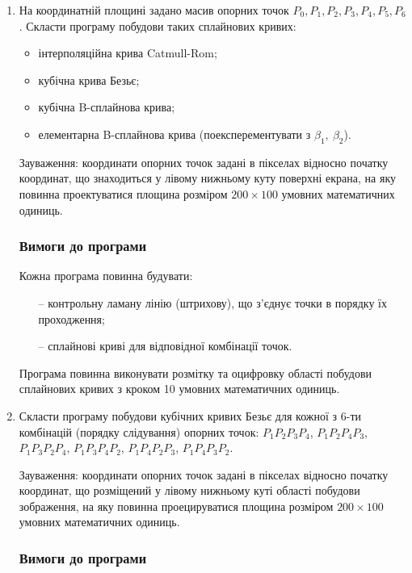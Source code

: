 \documentclass[a4paper,14pt]{extarticle} %
\begin{document}
\begin{enumerate}
    \item На координатній площині задано масив опорних точок $P_0, P_1, P_2, P_3, P_4, P_5, P_6$. 
    Скласти програму побудови таких сплайнових кривих:
    \begin{itemize}
        \item інтерполяційна крива Catmull-Rom;
        \item кубічна крива Безьє;
        \item кубічна B-сплайнова крива;
        \item елементарна B-сплайнова крива (поексперементувати з $\beta_1,\ \beta_2$).
    \end{itemize}

    Зауваження: координати опорних точок задані в пікселах відносно початку координат, що знаходиться у лівому 
    нижньому куту поверхні екрана, на яку повинна проектуватися площина розміром $200\times 100$ умовних математичних одиниць.
    
    \subsubsection*{Вимоги до програми}

    Кожна програма повинна будувати:
    \begin{itemize}
        \item[--] контрольну ламану лінію (штрихову), що з’єднує точки в порядку їх проходження;
        \item[--] сплайнові криві для відповідної комбінації точок. 
    \end{itemize}

    Програма повинна виконувати розмітку та оцифровку області побудови сплайнових кривих з кроком 10 умовних математичних одиниць.

    \item Скласти програму побудови кубічних кривих Безьє для кожної з 6-ти комбінацій (порядку слідування) 
    опорних точок: $P_1P_2P_3P_4$, $P_1P_2P_4P_3$, $P_1P_3P_2P_4$, $P_1P_3P_4P_2$, $P_1P_4P_2P_3$, $P_1P_4P_3P_2$.
    
    Зауваження: координати опорних точок задані в пікселах відносно початку координат, що розміщений у лівому 
    нижньому куті області побудови зображення, на яку повинна проецируватися площина розміром $200\times 100$ 
    умовних математичних одиниць.

    \subsubsection*{Вимоги до програми}
    

\end{enumerate}
\end{document}
